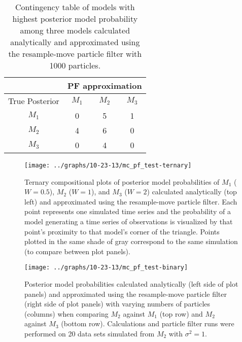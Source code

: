 \documentclass{article}
\begin{document}
\begin{table}
\begin{center}
\caption{Contingency table of models with highest posterior model probability among three models calculated analytically and approximated using the resample-move particle filter with 1000 particles.} \label{tab:cont-tab15}
\begin{tabular}{|c|c|c|c|}
\hline
 & \multicolumn{3}{|c|}{PF approximation} \\
 \hline
 True Posterior & $M_1$& $M_2$ & $M_3$ \\
 \hline
$M_1$  &  0  &  5  &  1 \\
\hline
$M_2$  &  4  &  6  &  0 \\
\hline
$M_3$  &  0  &  4  &  0 \\
 \hline
\end{tabular}
\end{center}
\end{table}

\begin{figure}
\texttt{[image: ../graphs/10-23-13/mc\_pf\_test-ternary]}
\caption{Ternary compositional plots of posterior model probabilities of $M_1$ ($W = 0.5$), $M_2$ ($W = 1$), and $M_3$ ($W = 2$) calculated analytically (top left) and approximated using the resample-move particle filter. Each point represents one simulated time series and the probability of a model generating a time series of observations is visualized by that point's proximity to that model's corner of the triangle. Points plotted in the same shade of gray correspond to the same simulation (to compare between plot panels).} \label{fig:ternary}
\end{figure}

\begin{figure}
\texttt{[image: ../graphs/10-23-13/mc\_pf\_test-binary]}
\caption{Posterior model probabilities calculated analytically (left side of plot panels) and approximated using the resample-move particle filter (right side of plot panels) with varying numbers of particles (columns) when comparing $M_2$ against $M_1$ (top row) and $M_2$ against $M_3$ (bottom row). Calculations and particle filter runs were performed on 20 data sets simulated from $M_2$ with $\sigma^2 = 1$.} \label{fig:binary}
\end{figure}

\clearpage



\end{document}
